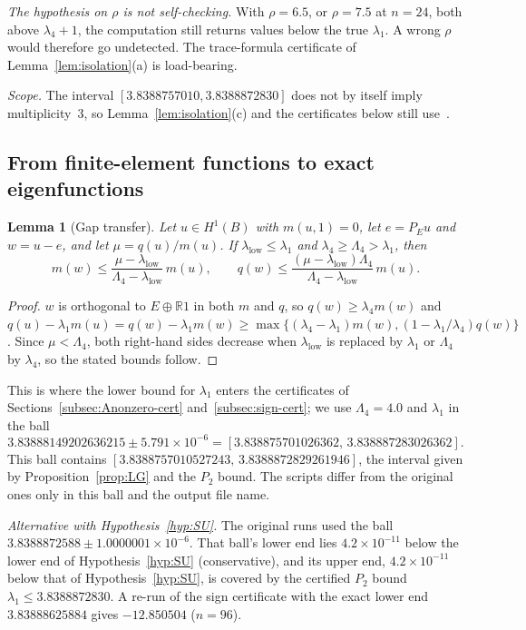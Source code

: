\documentclass[11pt]{amsart}
\newtheorem{lemma}[theorem]{Lemma}
\theoremstyle{definition}
\theoremstyle{remark}
\newcommand{\R}{\mathbb{R}}
\begin{document}
\emph{The hypothesis on $\rho$ is not self-checking.} With $\rho=6.5$, or $\rho=7.5$ at $n=24$, both
above $\lambda_4+1$, the computation still returns values below the true $\lambda_1$. A wrong $\rho$ would
therefore go undetected. The trace-formula certificate of Lemma~\ref{lem:isolation}(a) is load-bearing.

\emph{Scope.} The interval $[3.8388757010,3.8388872830]$ does not by itself imply multiplicity~$3$, so
Lemma~\ref{lem:isolation}(c) and the certificates below still use~\cite[Lemmas~7.2--7.3]{FBP-K}.

\subsection{From finite-element functions to exact eigenfunctions}\label{subsec:transfer}

\begin{lemma}[Gap transfer]\label{lem:transfer}
Let $u\in H^1(B)$ with $m(u,1)=0$, let $e=P_Eu$ and $w=u-e$, and let $\mu=q(u)/m(u)$. If
$\lambda_{\mathrm{low}}\le\lambda_1$ and $\lambda_4\ge\Lambda_4>\lambda_1$, then
\[
m(w)\le\frac{\mu-\lambda_{\mathrm{low}}}{\Lambda_4-\lambda_{\mathrm{low}}}\,m(u),\qquad
q(w)\le\frac{(\mu-\lambda_{\mathrm{low}})\Lambda_4}{\Lambda_4-\lambda_{\mathrm{low}}}\,m(u).
\]
\end{lemma}

\begin{proof}
$w$ is orthogonal to $E\oplus\R1$ in both $m$ and $q$, so $q(w)\ge\lambda_4m(w)$ and
$q(u)-\lambda_1m(u)=q(w)-\lambda_1m(w)\ge\max\{(\lambda_4-\lambda_1)m(w),(1-\lambda_1/\lambda_4)q(w)\}$.
Since $\mu<\Lambda_4$, both right-hand sides decrease when $\lambda_{\mathrm{low}}$ is replaced by
$\lambda_1$ or $\Lambda_4$ by $\lambda_4$, so the stated bounds follow.
\end{proof}

This is where the lower bound for $\lambda_1$ enters the certificates of
Sections~\ref{subsec:Anonzero-cert} and~\ref{subsec:sign-cert}; we use $\Lambda_4=4.0$ and
$\lambda_1$ in the ball
\[
3.83888149202636215\pm5.791\times10^{-6}=[3.838875701026362,\,3.838887283026362].
\] This ball contains
$[3.8388757010527243,\,3.8388872829261946]$, the interval given by Proposition~\ref{prop:LG} and the $P_2$
bound. The scripts differ from the original ones only in this ball and the output file name.

\emph{Alternative with Hypothesis~\ref{hyp:SU}.} The original runs used the ball
$3.8388872588\pm1.0000001\times10^{-6}$. That ball's lower
end lies $4.2\times10^{-11}$ below the lower end of Hypothesis~\ref{hyp:SU} (conservative), and its
upper end, $4.2\times10^{-11}$ below that of Hypothesis~\ref{hyp:SU}, is covered by the certified
$P_2$ bound $\lambda_1\le3.8388872830$. A re-run of the sign certificate with the exact lower end
$3.83888625884$ gives $-12.850504$ ($n=96$).
\end{document}
